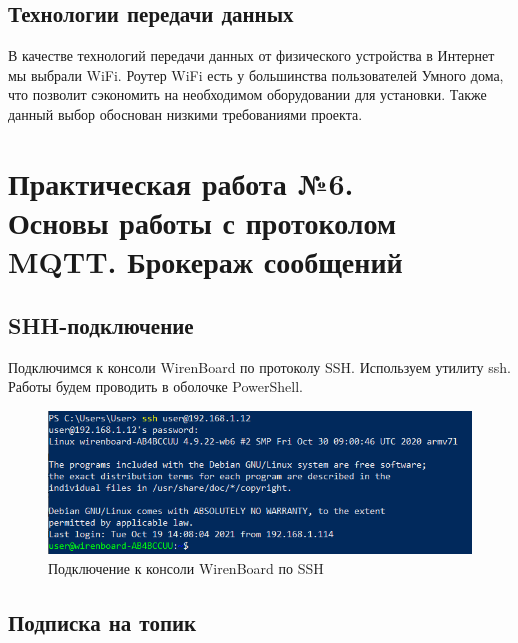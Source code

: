 \documentclass[a4paper,14pt]{extarticle}
\begin{document}
\subsection{Технологии передачи данных}

В качестве технологий передачи данных от физического устройства в Интернет мы выбрали WiFi. Роутер WiFi есть у большинства пользователей Умного дома, что позволит сэкономить на необходимом оборудовании для установки. Также данный выбор обоснован низкими требованиями проекта. 


\section{Практическая работа №6.\\ Основы работы с протоколом MQTT. Брокераж сообщений }

\subsection{SHH-подключение}
Подключимся к консоли WirenBoard по протоколу SSH. Используем утилиту ssh. Работы будем проводить в оболочке PowerShell.
\begin{figure}[h!]
	\centering
	\includegraphics[width=0.9\linewidth]{images/ssh-powershell}
	\caption{Подключение к консоли WirenBoard по SSH}
	\label{fig:ssh-powershell}
\end{figure}
%
\subsection{Подписка на топик}
\end{document}
